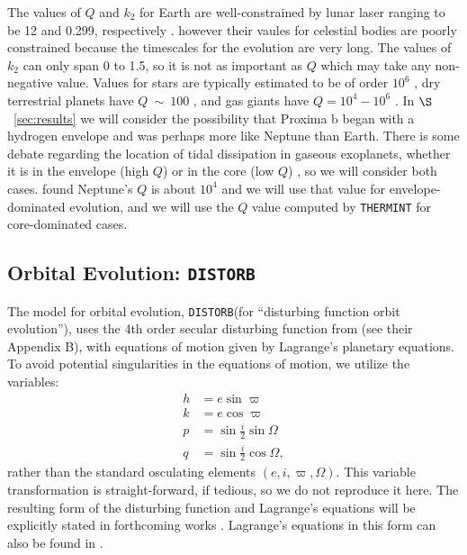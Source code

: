 \documentclass[preprint,12pt]{aastex}
\def\eg{{\it e.g.\ }}
\def\distorb{\texttt{\footnotesize{DISTORB}}\xspace}
\def\thermint{\texttt{\footnotesize{THERMINT}}\xspace}
\begin{document}
The values of $Q$ and $k_2$ for Earth are well-constrained by lunar
laser ranging \citep{Dickey94} to be 12 and 0.299, respectively
\citep{Williams78,Yoder95}. however their vaules for celestial bodies
are poorly constrained because the timescales for the evolution are
very long. The values of $k_2$ can only span 0 to 1.5, so it is not as
important as $Q$ which may take any non-negative value. Values for
stars are typically estimated to be of order $10^6$
\citep[\eg][]{Jackson09}, dry terrestrial planets have $Q~\sim~100$
\citep{Yoder95,Henning09}, and gas giants have $Q=10^4-10^6$
\citep{AksnesFranklin01,Jackson08a}. In $\S$~\ref{sec:results} we
will consider the possibility that Proxima b began with a hydrogen
envelope and was perhaps more like Neptune than Earth. There is some
debate regarding the location of tidal dissipation in gaseous
exoplanets, whether it is in the envelope (high $Q$) or in the core
(low $Q$) \citep[\eg][]{StorchLai14}, so we will consider both
cases. \cite{ZhangHamilton08} found Neptune's $Q$ is about $10^4$ and
we will use that value for envelope-dominated evolution, and we will
use the $Q$ value computed by \thermint for core-dominated cases.

\subsection{Orbital Evolution: \distorb}
\label{sec:models:distorb}
The model for orbital evolution, \distorb (for ``disturbing function
orbit evolution''), uses the 4th order secular disturbing function
from \cite{MurrayDermott99} (see their Appendix B), with equations of
motion given by Lagrange's planetary equations. To avoid potential
singularities in the equations of motion, we utilize the variables:
\begin{align}
h & = e \sin{\varpi} \\
k & = e \cos{\varpi} \\
p & = \sin{\frac{i}{2}} \sin{\Omega} \label{eqnp}\\
q & = \sin{\frac{i}{2}} \cos{\Omega} \label{eqnq},
\end{align}
rather than the standard osculating elements $(e,i,\varpi,\Omega)$. This 
variable transformation is straight-forward, if tedious, so we do not 
reproduce it here. The resulting form of the disturbing function and 
Lagrange's equations will be explicitly stated in forthcoming works 
\citep{Barnes16, Deitrick16}. Lagrange's equations in this form 
can also be found in \cite{Berger1991}. 
\end{document}
